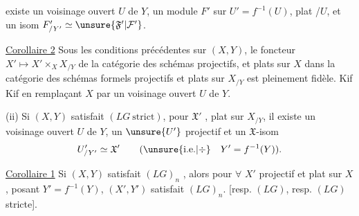 
existe un voisinage ouvert $U$ de $Y$, 
un module $F'$ sur $U'=f^{-1}(U)$, plat /$U$, et un
isom $F'_{/Y'}\simeq\unsure{\mathfrak F'|\mathcal F'}$.

\uline{Corollaire 2} Sous les conditions précédentes sur
$(X,Y)$, 
le foncteur $X'\longmapsto X'\times_X X_{/Y}$
de la catégorie des schémas  projectifs,
et plats sur $X$ dans la catégorie des
schémas formels projectifs et plats sur $X_{/Y}$
est pleinement fidèle. Kif Kif en
remplaçant $X$ par un voisinage ouvert $U$ de $Y$.


(ii) Si $(X,Y)$ satisfait $(LG\ \text{strict})$, pour
 $\mathfrak X'$ 
, plat sur $X_{/Y}$, il existe
un voisinage ouvert $U$ de $Y$,  un
$\unsure{U'}$ projectif 
 et un
$\mathfrak X$-isom
\[
U'_{/Y'}\simeq\mathfrak X'\qquad (\unsure{\text{i.e.}|\div}\quad Y'=f^{-1}(Y)).
\]

\uline{Corollaire 1} 
 Si $(X,Y)$ satisfait $(LG)_n$
,
alors pour $\forall$ $X'$ projectif et plat sur $X$,
posant  $Y'=f^{-1}(Y)$,
$(X',Y')$ satisfait $(LG)_n$.
[resp. $(LG)$, resp. $(LG)$ stricte].

